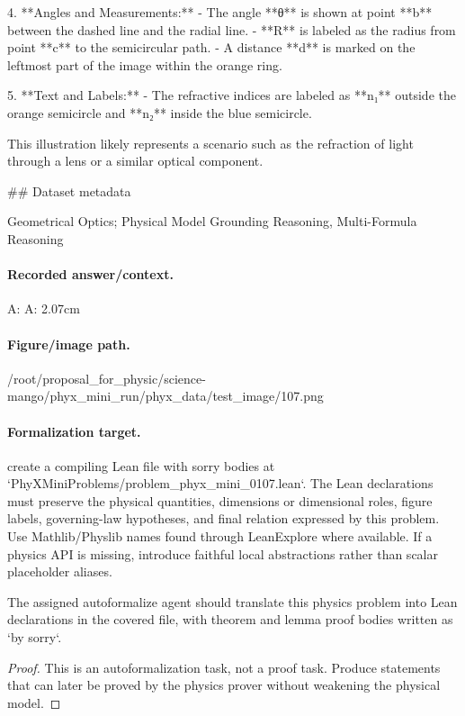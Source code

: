 4. **Angles and Measurements:**
   - The angle **θ** is shown at point **b** between the dashed line and the radial line.
   - **R** is labeled as the radius from point **c** to the semicircular path.
   - A distance **d** is marked on the leftmost part of the image within the orange ring.

5. **Text and Labels:**
   - The refractive indices are labeled as **n₁** outside the orange semicircle and **n₂** inside the blue semicircle.

This illustration likely represents a scenario such as the refraction of light through a lens or a similar optical component.

\#\# Dataset metadata

Geometrical Optics; Physical Model Grounding Reasoning, Multi-Formula Reasoning

\paragraph{Recorded answer/context.}
A: A: 2.07cm

\paragraph{Figure/image path.}
/root/proposal\_for\_physic/science-mango/phyx\_mini\_run/phyx\_data/test\_image/107.png

\paragraph{Formalization target.}
create a compiling Lean file with sorry bodies at `PhyXMiniProblems/problem\_phyx\_mini\_0107.lean`. The Lean declarations must preserve the physical quantities, dimensions or dimensional roles, figure labels, governing-law hypotheses, and final relation expressed by this problem.
Use Mathlib/Physlib names found through LeanExplore where available. If a physics API is missing, introduce faithful local abstractions rather than scalar placeholder aliases.

\begin{theorem}
\label{thm:physics:phyx_mini_0107:target}
The assigned autoformalize agent should translate this physics problem into Lean declarations in the covered file, with theorem and lemma proof bodies written as `by sorry`.
\end{theorem}
\begin{proof}
This is an autoformalization task, not a proof task. Produce statements that can later be proved by the physics prover without weakening the physical model.
\end{proof}

